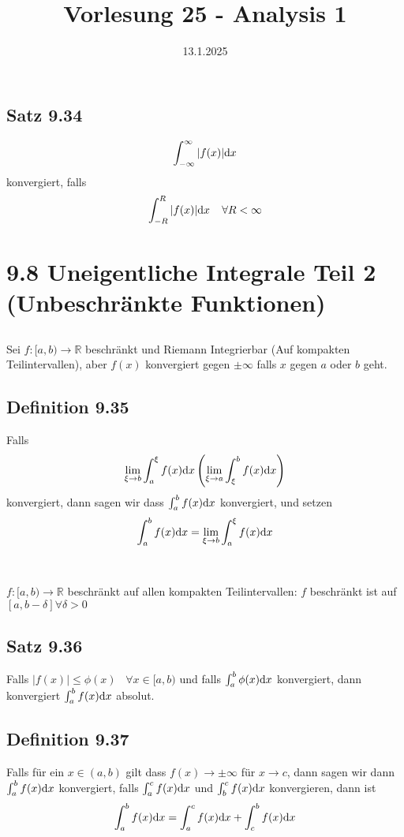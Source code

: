 \documentclass[]{scrartcl}
\title{Vorlesung 25 - Analysis 1}
\author{}
\date{13.1.2025}
\begin{document}
\maketitle
\newpage
\tableofcontents
\newpage

 \subsection{Satz 9.34}

$$
	\int_{-\infty}^\infty |f(x)| \text dx
$$
konvergiert, falls
$$
	\int_{-R}^R |f(x)| \text dx \;\;\;\;\forall R<\infty
$$

\section{9.8 Uneigentliche Integrale Teil 2 (Unbeschränkte Funktionen)}

\subsection{}
Sei $f:[a,b)\rightarrow \mathbb R$ beschränkt und Riemann Integrierbar (Auf kompakten Teilintervallen), aber $f(x)$ konvergiert gegen $\pm\infty$ falls $x$ gegen $a$ oder $b$ geht.

\subsection{Definition 9.35}
Falls
$$
\lim_{\xi\rightarrow b} \int_a^\xi f(x)\text dx \left(\lim_{\xi\rightarrow a} \int_\xi^b f(x)\text dx\right)
$$
konvergiert, dann sagen wir dass $\int_a^b f(x)\text dx$ konvergiert, und setzen
$$
\int_a^b f(x) \text dx = \lim_{\xi\rightarrow b}\int_a^\xi f(x)\text dx
$$
\\\\
$f:[a,b)\rightarrow \mathbb R$ beschränkt auf allen kompakten Teilintervallen: $f$ beschränkt ist auf $[a,b-\delta]\forall \delta>0$

\subsection{Satz 9.36}
Falls $|f(x)| \leq \phi(x)\;\;\;\forall x\in[a,b)$ und falls $\int_a^b \phi(x) \text dx$ konvergiert, dann konvergiert $\int_a^b f(x)\text dx$ absolut.

\subsection{Definition 9.37}
Falls für ein $x\in (a,b)$ gilt dass $f(x)\rightarrow\pm\infty$ für $x\rightarrow c$, dann sagen wir dann $\int_a^b f(x) \text dx$ konvergiert, falls $\int_a^c f(x)\text dx$ und $\int_b^c f(x)\text dx$ konvergieren, dann ist
$$
\int_a^b f(x) \text dx = \int_a^c f(x)\text dx + \int_c^b f(x)\text dx
$$
\end{document}
